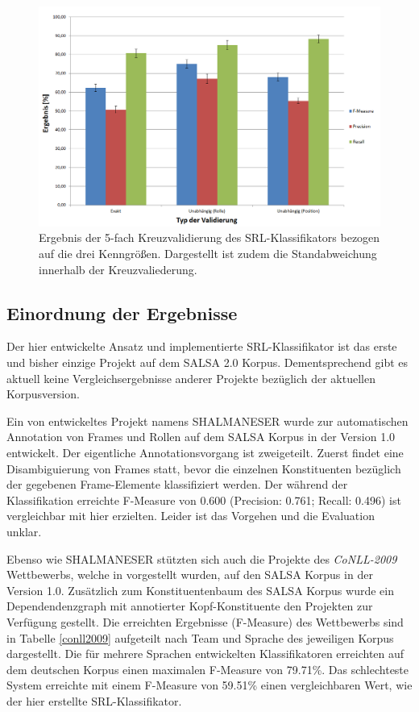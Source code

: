 \documentclass[12pt]{article}
\begin{document}
		\begin{figure}[tb!]
			\centering
			\includegraphics[scale=0.5]{images/ergebnisseKreuzvalidierung.png}
			\caption[Ergebnis der 5-fach Kreuzvalidierung]{Ergebnis der 5-fach Kreuzvalidierung des SRL-Klassifikators bezogen auf die drei Kenngrößen. Dargestellt ist zudem die Standabweichung innerhalb der Kreuzvaliederung.}
			\label{evalKreuzvalidierung}
		\end{figure}

\subsection{Einordnung der Ergebnisse}
		
Der hier entwickelte Ansatz und implementierte SRL-Klassifikator ist das erste und bisher einzige Projekt auf dem SALSA 2.0 Korpus. Dementsprechend gibt es aktuell keine Vergleichsergebnisse anderer Projekte bezüglich der aktuellen Korpusversion.

Ein von \cite{erk2006shalmaneser} entwickeltes Projekt namens SHALMANESER wurde zur automatischen Annotation von Frames und Rollen auf dem SALSA Korpus in der Version 1.0 entwickelt. Der eigentliche Annotationsvorgang ist zweigeteilt. Zuerst findet eine Disambiguierung von Frames statt, bevor die einzelnen Konstituenten bezüglich der gegebenen Frame-Elemente klassifiziert werden. Der während der Klassifikation erreichte F-Measure von 0.600 (Precision: 0.761; Recall: 0.496) ist vergleichbar mit hier erzielten. Leider ist das Vorgehen und die Evaluation unklar.

Ebenso wie SHALMANESER stützten sich auch die Projekte des \textit{CoNLL-2009} Wettbewerbs, welche in \cite{hajivc2009conll} vorgestellt wurden, auf den SALSA Korpus in der Version 1.0. Zusätzlich zum Konstituentenbaum des SALSA Korpus wurde ein Dependendenzgraph mit annotierter Kopf-Konstituente den Projekten zur Verfügung gestellt. Die erreichten Ergebnisse (F-Measure) des Wettbewerbs sind in Tabelle \ref{conll2009} aufgeteilt nach Team und Sprache des jeweiligen Korpus dargestellt. Die für mehrere Sprachen entwickelten Klassifikatoren erreichten auf dem deutschen Korpus einen maximalen F-Measure von 79.71\%. Das schlechteste System erreichte mit einem F-Measure von 59.51\% einen vergleichbaren Wert, wie der hier erstellte SRL-Klassifikator.
\end{document}
